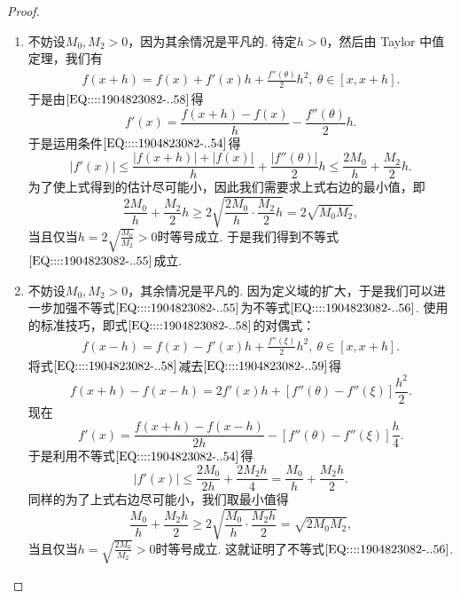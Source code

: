 \documentclass[../../main.tex]{subfiles}
\begin{document}
\begin{proof}
\begin{enumerate}
\item 不妨设\( M_0, M_2 > 0 \)，因为其余情况是平凡的. 待定\( h > 0 \)，然后由 Taylor 中值定理，我们有
\begin{align}
f(x + h) = f(x) + f'(x)h + \frac{f''(\theta)}{2} h^2, \ \theta \in [x, x + h]. \label{EQ::::1904823082-..58}
\end{align}
于是由\(\eqref{EQ::::1904823082-..58}\)得
\[
f'(x) = \frac{f(x + h) - f(x)}{h} - \frac{f''(\theta)}{2} h.
\]
于是运用条件\(\eqref{EQ::::1904823082-..54}\)得
\[
|f'(x)| \leqslant \frac{|f(x + h)| + |f(x)|}{h} + \frac{|f''(\theta)|}{2} h \leqslant \frac{2 M_0}{h} + \frac{M_2}{2} h.
\]
为了使上式得到的估计尽可能小，因此我们需要求上式右边的最小值，即
\[
\frac{2 M_0}{h} + \frac{M_2}{2} h \geqslant 2\sqrt{\frac{2 M_0}{h} \cdot \frac{M_2}{2} h} = 2\sqrt{M_0 M_2},
\]
当且仅当\( h = 2\sqrt{\frac{M_0}{M_2}} > 0 \)时等号成立. 于是我们得到不等式\(\eqref{EQ::::1904823082-..55}\)成立.

\item 不妨设\( M_0, M_2 > 0 \)，其余情况是平凡的. 因为定义域的扩大，于是我们可以进一步加强不等式\(\eqref{EQ::::1904823082-..55}\)为不等式\(\eqref{EQ::::1904823082-..56}\). 使用的标准技巧，即式\(\eqref{EQ::::1904823082-..58}\)的对偶式：
\begin{align}
f(x - h) = f(x) - f'(x)h + \frac{f''(\xi)}{2} h^2, \ \theta \in [x, x + h]. \label{EQ::::1904823082-..59}
\end{align}
将式\(\eqref{EQ::::1904823082-..58}\)减去\(\eqref{EQ::::1904823082-..59}\)得
\[
f(x + h) - f(x - h) = 2 f'(x)h + \left[ f''(\theta) - f''(\xi) \right] \frac{h^2}{2}.
\]
现在
\[
f'(x) = \frac{f(x + h) - f(x - h)}{2h} - \left[ f''(\theta) - f''(\xi) \right] \frac{h}{4}.
\]
于是利用不等式\(\eqref{EQ::::1904823082-..54}\)得
\[
|f'(x)| \leqslant \frac{2 M_0}{2h} + \frac{2 M_2 h}{4} = \frac{M_0}{h} + \frac{M_2 h}{2}.
\]
同样的为了上式右边尽可能小，我们取最小值得
\[
\frac{M_0}{h} + \frac{M_2 h}{2} \geqslant 2\sqrt{\frac{M_0}{h} \cdot \frac{M_2 h}{2}} = \sqrt{2 M_0 M_2},
\]
当且仅当\( h = \sqrt{\frac{2 M_0}{M_2}} > 0 \)时等号成立. 这就证明了不等式\(\eqref{EQ::::1904823082-..56}\).


\end{enumerate}
\end{proof}
\end{document}
